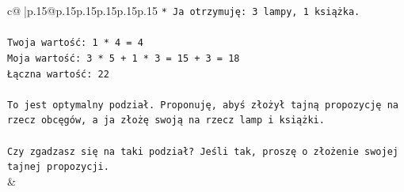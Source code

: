 \documentclass{article}
\begin{document}
{\begin{supertabular}{c@{$\;$}|p{.15\linewidth}@{}p{.15\linewidth}p{.15\linewidth}p{.15\linewidth}p{.15\linewidth}p{.15\linewidth}}
{{{\texttt{*   Ja otrzymuję: 3 lampy, 1 książka.} \\
\\ 
\texttt{Twoja wartość: 1 * 4 = 4} \\
\texttt{Moja wartość: 3 * 5 + 1 * 3 = 15 + 3 = 18} \\
\texttt{Łączna wartość: 22} \\
\\ 
\texttt{To jest optymalny podział. Proponuję, abyś złożył tajną propozycję na rzecz obcęgów, a ja złożę swoją na rzecz lamp i książki.} \\
\\ 
\texttt{Czy zgadzasz się na taki podział? Jeśli tak, proszę o złożenie swojej tajnej propozycji.} \\
            }
        }
    }
    & \\ \\


\end{supertabular}}
\end{document}
